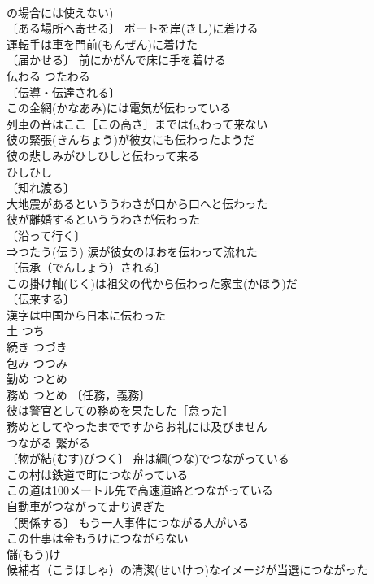 \documentclass[8pt]{extreport}
\begin{document}
\begin{CJK}{UTF8}{min}
\\	の場合には使えない) 
\\	〔ある場所へ寄せる〕 ボートを岸(きし)に着ける 
\\	運転手は車を門前(もんぜん)に着けた 
\\	〔届かせる〕 前にかがんで床に手を着ける 
\\	伝わる	つたわる	
\\	〔伝導・伝達される〕
\\	この金網(かなあみ)には電気が伝わっている 
\\	列車の音はここ［この高さ］までは伝わって来ない 
\\	彼の緊張(きんちょう)が彼女にも伝わったようだ 
\\	彼の悲しみがひしひしと伝わって来る 
\\	ひしひし　
\\	〔知れ渡る〕
\\	大地震があるといううわさが口から口へと伝わった 
\\	彼が離婚するといううわさが伝わった 
\\	〔沿って行く〕
\\	⇒つたう(伝う) 涙が彼女のほおを伝わって流れた 
\\	〔伝承（でんしょう）される〕
\\	この掛け軸(じく)は祖父の代から伝わった家宝(かほう)だ 
\\	〔伝来する〕
\\	漢字は中国から日本に伝わった 
\\	土	つち	
\\	続き	つづき	
\\	包み	つつみ	
\\	勤め	つとめ	
\\	務め	つとめ	〔任務，義務〕
\\	彼は警官としての務めを果たした［怠った］ 
\\	務めとしてやったまでですからお礼には及びません 
\\	つながる	繋がる	
\\	〔物が結(むす)びつく〕 舟は綱(つな)でつながっている 
\\	この村は鉄道で町につながっている 
\\	この道は100メートル先で高速道路とつながっている 
\\	自動車がつながって走り過ぎた 
\\	〔関係する〕 もう一人事件につながる人がいる 
\\	この仕事は金もうけにつながらない 
\\	儲(もう)け　
\\	候補者（こうほしゃ）の清潔(せいけつ)なイメージが当選につながった 

\end{CJK}
\end{document}
